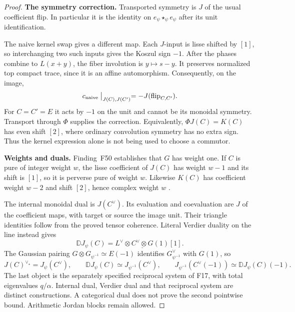 \documentclass[11pt,a4paper]{article}
\newcommand{\fid}[1]{\textsf{#1}}\newcommand{\gate}[1]{\textsf{#1}}
\theoremstyle{named}\newtheorem{finding}{Finding}[section]
\theoremstyle{definition}\newtheorem{definition}[finding]{Definition}
\theoremstyle{remark}\newtheorem{remark}[finding]{Remark}
\begin{document}
\begin{proof}
\par\smallskip\noindent\textbf{The symmetry correction.}\quad
Transported symmetry is $J$ of the usual coefficient flip.
In particular it is the identity on $e_\psi\star_\psi e_\psi$
after its unit identification.

The naive kernel swap gives a different map.
Each $J$-input is lisse shifted by $[1]$, so interchanging
two such inputs gives the Koszul sign $-1$.
After the phases combine to $L(x+y)$, the fiber involution
is $y\mapsto s-y$. It preserves normalized top compact
trace, since it is an affine automorphism.
Consequently, on the image,
\[
 c_{\mathrm{naive}}\bigm|_{J(C),J(C')}
       =-J(\operatorname{flip}_{C,C'}).
\]
For $C=C'=E$ it acts by $-1$ on the unit and cannot be its
monoidal symmetry. Transport through $\Phi$ supplies
the correction. Equivalently, $\Phi J(C)=K(C)$ has
even shift $[2]$, where ordinary convolution symmetry
has no extra sign.
Thus the kernel expression alone is not being used
to choose a commutor.

\par\smallskip\noindent\textbf{Weights and duals.}\quad
Finding~\fid{F50} establishes that $G$ has weight one.
If $C$ is pure of integer weight $w$, the lisse
coefficient of $J(C)$ has weight $w-1$ and its shift
is $[1]$, so it is perverse pure of weight $w$.
Likewise $K(C)$ has coefficient weight $w-2$ and
shift $[2]$, hence complex weight $w$
\cite[5.1.8, pp.~126--127]{BBD}.

The internal monoidal dual is $J(C^\vee)$.
Its evaluation and coevaluation are $J$ of the
coefficient maps, with target or source the image unit.
Their triangle identities follow from the proved
tensor coherence.
Literal Verdier duality on the line instead gives
\[
 \mathbb D J_\psi(C)
   =L^\vee\otimes\underline{C^\vee\otimes G}(1)[1].
\]
The Gaussian pairing
$G\otimes G_{\psi^{-1}}\simeq E(-1)$ identifies
$G_{\psi^{-1}}^\vee$ with $G(1)$, so
\begin{equation}\label{eq:gaussianthreeduals}
 J(C)^{\vee_\star}=J_\psi(C^\vee),\qquad
 \mathbb D J_\psi(C)\simeq J_{\psi^{-1}}(C^\vee),\qquad
 J_{\psi^{-1}}(C^\vee(-1))
       \simeq\mathbb D J_\psi(C)(-1).
\end{equation}
The last object is the separately specified reciprocal
system of \fid{F17}, with total eigenvalues $q/\alpha$.
Internal dual, Verdier dual and that reciprocal system
are distinct constructions. A categorical dual does not
prove the second pointwise bound.
Arithmetic Jordan blocks remain allowed.


\end{proof}
\end{document}
